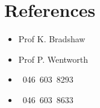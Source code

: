\documentclass[12pt,a4paper,sans]{moderncv}        %
\begin{document}
\section{References}
\begin{cvcolumns}
    		{\begin{itemize}\item Prof K. Bradshaw\item Prof P. Wentworth\end{itemize}}
  			{\begin{itemize}\item ~046~603~8293 \item ~046~603~8633 \end{itemize}}
\end{cvcolumns}

\nocite{*}



\end{document}
